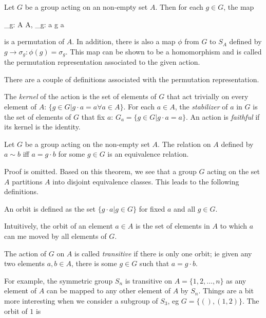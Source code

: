 
Let $G$ be a group acting on an non-empty set $A$. Then for each $g \in G$, the map

\bee
\sigma_g: A \rightarrow A, \quad \sigma_g: a \rightarrow g \cdot a
\eee

is a permutation of $A$. In addition, there is also a map $\phi$ from $G$ to $S_A$ defined by $g \rightarrow \sigma_g: \phi(g) = \sigma_g$. This map can be shown to be a homomorphism and is called the permutation representation associated to the given action.

There are a couple of definitions associated with the permutation representation.

\begin{definition}
The \emph{kernel} of the action is the set of elements of $G$ that act trivially on every element of $A$: $\{g \in G | g \cdot a = a \forall a \in A\}$. For each $a \in A$, the \emph{stabilizer} of $a$ in $G$ is the set of elements of $G$ that fix $a$: $G_a = \{g \in G | g \cdot a = a\}$. An action is \emph{faithful} if its kernel is the identity.
\end{definition}

\begin{theorem}
Let $G$ be a group acting on the non-empty set $A$. The relation on $A$ defined by $a \sim b$ iff $a = g \cdot b$ for some $g \in G$ is an equivalence relation.
\end{theorem}

Proof is omitted. Based on this theorem, we see that a group $G$ acting on the set $A$ partitions $A$ into disjoint equivalence classes. This leads to the following definitions.

\begin{definition}
An orbit is defined as the set $\{ g \cdot a | g \in G\}$ for fixed $a$ and all $g \in G$.
\end{definition}

Intuitively, the orbit of an element $a \in A$ is the set of elements in $A$ to which $a$ can me moved by all elements of $G$.

\begin{definition}
The action of $G$ on $A$ is called \emph{transitive} if there is only one orbit; ie given any two elements $a, b \in A$, there is some $g \in G$ such that $a = g \cdot b$.
\end{definition}

For example, the symmetric group $S_n$ is transitive on $A = \{1,2,\ldots, n\}$ as any element of $A$ can be mapped to any other element of $A$ by $S_n$. Things are a bit more interesting when we consider a subgroup of $S_3$, eg $G = \{(), (1,2)\}$. The orbit of $1$ is 

